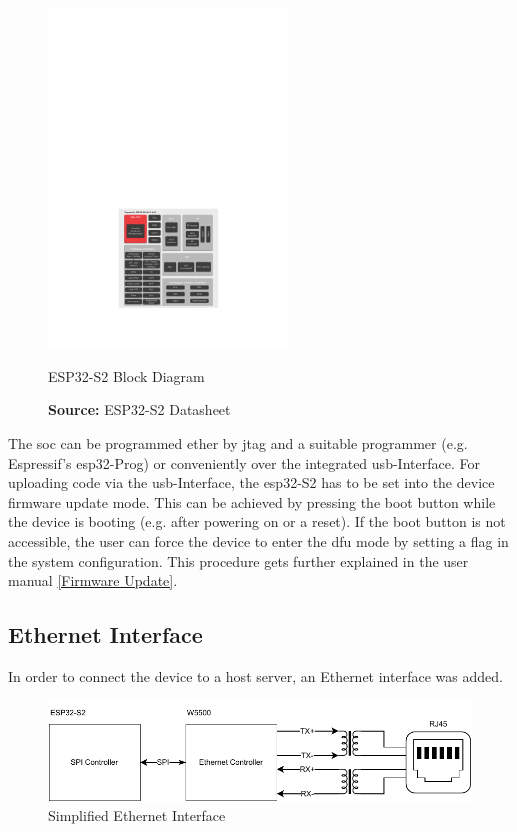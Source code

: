 \begin{figure}[h!]
	\centering
	\includegraphics[height=9cm]{images/esp32-s2_block_diagram}
	\caption{ESP32-S2 Block Diagram}
	\vspace{-1.4ex}
	\caption*{\textbf{Source:} ESP32-S2 Datasheet \cite{esp32-s2_datasheet}}
	\label{fig:esp32-s2_block_diagram}
\end{figure}

The \acrshort{soc} can be programmed ether by \acrshort{jtag} and a suitable programmer (e.g. Espressif's \gls{esp32}-Prog) or conveniently over the integrated \acrshort{usb}-Interface.\newline
For uploading code via the \acrshort{usb}-Interface, the \gls{esp32}-S2 has to be set into the device firmware update mode. This can be achieved by pressing the boot button while the device is booting (e.g. after powering on or a reset). If the boot button is not accessible, the user can force the device to enter the \acrshort{dfu} mode by setting a flag in the system configuration. This procedure gets further explained in the user manual \ref{Firmware Update}.
\newpage

\subsection{Ethernet Interface}
In order to connect the device to a host server, an Ethernet interface was added.

\begin{figure}[h!]
	\centering
	\includegraphics[width=\textwidth]{images/eth_interface}
	\vspace{0.2cm}
	\caption{Simplified Ethernet Interface}
	\label{fig:eth-interface}
\end{figure}

